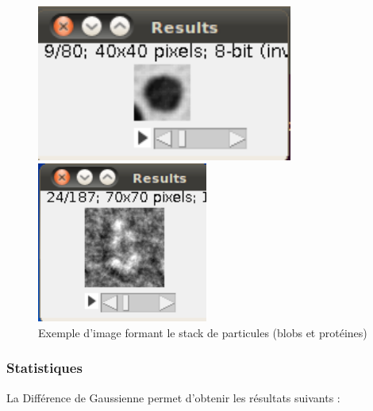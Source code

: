\begin{figure}[ht]
\begin{center}
 \begin{minipage}{.450\linewidth}
  \includegraphics[width=0.75\textwidth]{cropblob.png}  
 \end{minipage} \hfill
\begin{minipage}{.450\linewidth}
  \includegraphics[width=0.5\textwidth]{cropprotDog.png}   
 \end{minipage} \hfill
\caption{Exemple d'image formant le stack de particules (blobs et protéines)}
\end{center}
\end{figure}

\subsubsection*{Statistiques}

La Différence de Gaussienne permet d'obtenir les résultats suivants :

